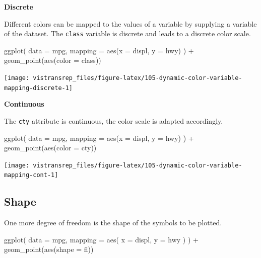 \documentclass[]{book}
\newenvironment{Shaded}{}{}
\newcommand{\DataTypeTok}[1]{#1}
\newcommand{\KeywordTok}[1]{\textcolor[rgb]{0.00,0.00,1.00}{#1}}
\newcommand{\NormalTok}[1]{#1}
\newcommand{\OperatorTok}[1]{#1}
\newcommand{\StringTok}[1]{\textcolor[rgb]{0.00,0.50,0.50}{#1}}
\begin{document}
\textbf{Discrete}

Different colors can be mapped to the values of a variable by supplying a variable of the dataset.
The \texttt{class} variable is discrete and leads to a discrete color scale.

\begin{Shaded}
\begin{Highlighting}[]
\KeywordTok{ggplot}\NormalTok{(}
  \DataTypeTok{data =}\NormalTok{ mpg,}
  \DataTypeTok{mapping =} \KeywordTok{aes}\NormalTok{(}\DataTypeTok{x =}\NormalTok{ displ, }\DataTypeTok{y =}\NormalTok{ hwy)}
\NormalTok{) }\OperatorTok{+}
\StringTok{  }\KeywordTok{geom_point}\NormalTok{(}\KeywordTok{aes}\NormalTok{(}\DataTypeTok{color =}\NormalTok{ class))}
\end{Highlighting}
\end{Shaded}

\begin{flushright}\texttt{[image: vistransrep\_files/figure-latex/105-dynamic-color-variable-mapping-discrete-1]} \end{flushright}

\textbf{Continuous}

The \texttt{cty} attribute is continuous, the color scale is adapted accordingly.

\begin{Shaded}
\begin{Highlighting}[]
\KeywordTok{ggplot}\NormalTok{(}
  \DataTypeTok{data =}\NormalTok{ mpg,}
  \DataTypeTok{mapping =} \KeywordTok{aes}\NormalTok{(}\DataTypeTok{x =}\NormalTok{ displ, }\DataTypeTok{y =}\NormalTok{ hwy)}
\NormalTok{) }\OperatorTok{+}
\StringTok{  }\KeywordTok{geom_point}\NormalTok{(}\KeywordTok{aes}\NormalTok{(}\DataTypeTok{color =}\NormalTok{ cty))}
\end{Highlighting}
\end{Shaded}

\begin{flushright}\texttt{[image: vistransrep\_files/figure-latex/105-dynamic-color-variable-mapping-cont-1]} \end{flushright}

\hypertarget{shape}{%
\subsection{Shape}\label{shape}}

One more degree of freedom is the shape of the symbols to be plotted.

\begin{Shaded}
\begin{Highlighting}[]
\KeywordTok{ggplot}\NormalTok{(}
  \DataTypeTok{data =}\NormalTok{ mpg,}
  \DataTypeTok{mapping =} \KeywordTok{aes}\NormalTok{(}
    \DataTypeTok{x =}\NormalTok{ displ,}
    \DataTypeTok{y =}\NormalTok{ hwy}
\NormalTok{  )}
\NormalTok{) }\OperatorTok{+}
\StringTok{  }\KeywordTok{geom_point}\NormalTok{(}\KeywordTok{aes}\NormalTok{(}\DataTypeTok{shape =}\NormalTok{ fl))}
\end{Highlighting}
\end{Shaded}
\end{document}
